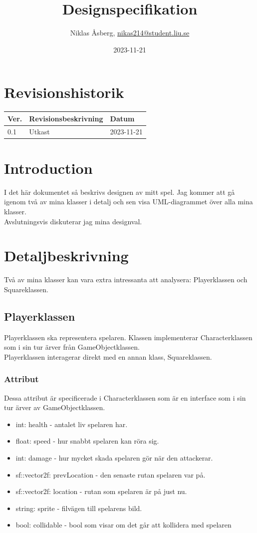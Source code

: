 \documentclass{TDP005mall}
\author{Niklas Åsberg, \url{nikas214@student.liu.se}}
\title{Designspecifikation}
\date{2023-11-21}
\begin{document}
\projectpage
\section{Revisionshistorik}
\begin{table}[!h]
\begin{tabularx}{\linewidth}{|l|X|l|}
\hline
Ver. & Revisionsbeskrivning & Datum \\\hline
0.1 & Utkast & 2023-11-21 \\\hline
\end{tabularx}
\end{table}

\tableofcontents
\newpage

\section{Introduction}
I det här dokumentet så beskrivs designen av mitt spel. Jag kommer att gå igenom två av mina klasser i detalj och sen visa UML-diagrammet över alla mina klasser. \\
Avslutningsvis diskuterar jag mina designval.

\section{Detaljbeskrivning}
Två av mina klasser kan vara extra intressanta att analysera: Playerklassen och Squareklassen.

\subsection{Playerklassen}
Playerklassen ska representera spelaren. Klassen implementerar Characterklassen som i sin tur ärver från GameObjectklassen. \\
Playerklassen interagerar direkt med en annan klass, Squareklassen. 
\subsubsection{Attribut}
Dessa attribut är specificerade i Characterklassen som är en interface som i sin tur ärver av GameObjectklassen.
\begin{itemize}
  \item int: health - antalet liv spelaren har.
  \item float: speed - hur snabbt spelaren kan röra sig.
  \item int: damage - hur mycket skada spelaren gör när den attackerar.
  \item sf::vector2f: prevLocation - den senaste rutan spelaren var på.
  \item sf::vector2f: location - rutan som spelaren är på just nu.
  \item string: sprite - filvägen till spelarens bild.
  \item bool: collidable - bool som visar om det går att kollidera med spelaren
\end{itemize}
\end{document}

